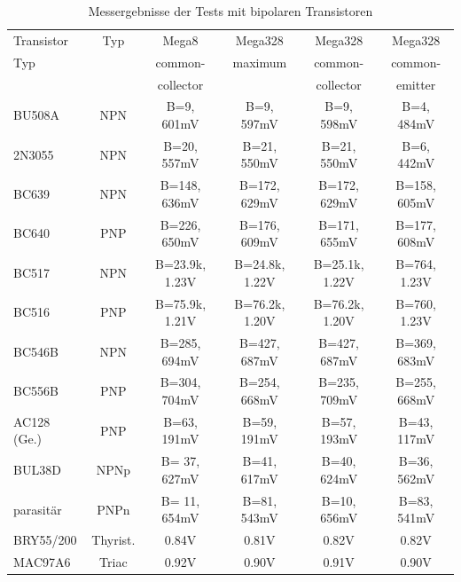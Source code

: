 \begin{table}[H]
  \begin{center}
    \begin{tabular}{| l | c | c | c | c | c |}
    \hline
 Transistor & Typ & Mega8           & Mega328        & Mega328         & Mega328 \\
    Typ     &     & common-         & maximum        & common-         & common- \\
            &     & collector       &                & collector       & emitter \\
    \hline
    \hline
BU508A      & NPN & B=9, 601mV      &  B=9, 597mV    &   B=9, 598mV    & B=4, 484mV \\
    \hline
2N3055      & NPN & B=20, 557mV     &  B=21, 550mV   &   B=21, 550mV   & B=6, 442mV \\
    \hline
BC639       & NPN & B=148, 636mV    &  B=172, 629mV  &   B=172, 629mV  & B=158, 605mV \\
    \hline
BC640       & PNP & B=226, 650mV    &  B=176, 609mV  &   B=171, 655mV  & B=177, 608mV \\
    \hline
BC517       & NPN & B=23.9k, 1.23V  &  B=24.8k, 1.22V&   B=25.1k, 1.22V & B=764, 1.23V \\
    \hline
BC516       & PNP & B=75.9k, 1.21V  &  B=76.2k, 1.20V&   B=76.2k, 1.20V & B=760, 1.23V \\
    \hline
BC546B      & NPN & B=285, 694mV    &  B=427, 687mV  &   B=427, 687mV   & B=369, 683mV \\
    \hline
BC556B      & PNP & B=304, 704mV    &  B=254, 668mV  &   B=235, 709mV   & B=255, 668mV \\
    \hline
AC128 (Ge.) & PNP & B=63, 191mV     &  B=59, 191mV   &   B=57, 193mV    & B=43, 117mV \\
    \hline
BUL38D      & NPNp & B= 37, 627mV    &  B=41, 617mV  &   B=40, 624mV    & B=36, 562mV \\
parasitär   & PNPn & B= 11, 654mV    &  B=81, 543mV  &   B=10, 656mV    & B=83, 541mV \\
    \hline
BRY55/200   & Thyrist. &  0.84V      &  0.81V        &  0.82V           &  0.82V \\
    \hline
MAC97A6     & Triac &   0.92V        &  0.90V        &  0.91V           &  0.90V    \\
    \hline
    \end{tabular}
  \end{center}
  \caption{Messergebnisse der Tests mit bipolaren Transistoren}
  \label{tab:bipolar} 
\end{table}

